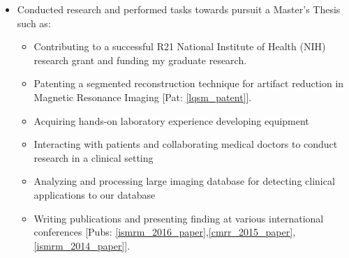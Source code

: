 \begin{minipage}{\textwidth}
	\begin{itemize}
		\item Conducted research and performed tasks towards pursuit a Master's Thesis such as: \vspace{2mm}
		\begin{itemize}
			\item Contributing to a successful R21 National Institute of Health (NIH) research grant and funding my graduate research.
			\item Patenting a segmented reconstruction technique for artifact reduction in Magnetic Resonance Imaging [Pat: \ref{lqsm_patent}].
			\item Acquiring hands-on laboratory experience developing equipment  
			\item Interacting with patients and collaborating medical doctors to conduct research in a clinical setting
			\item Analyzing and processing large imaging database for detecting clinical applications to our database 
			\item Writing publications and presenting finding at various international conferences [Pubs: \ref{ismrm_2016_paper},\ref{cmrr_2015_paper},\ref{ismrm_2014_paper}].
		\end{itemize}


\end{itemize}
\end{minipage}
